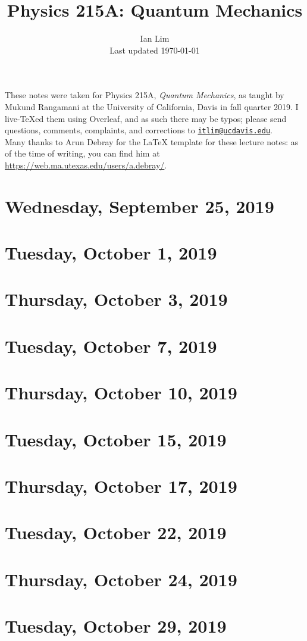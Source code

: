 \documentclass{../mynotes}
\begin{document}
\title{Physics 215A: Quantum Mechanics}
\author{Ian Lim\\ Last updated \today}
\maketitle
{\small\noindent These notes were taken for Physics 215A, \emph{Quantum Mechanics}, as taught by Mukund Rangamani at the University of California, Davis in fall quarter 2019. I live-\TeX ed them using Overleaf, and as such there may be typos; please send questions, comments, complaints, and corrections to 
\href{mailto:itlim@ucdavis.edu?subject=215A\%20Lecture\%20Notes}{\texttt{itlim@ucdavis.edu}}.\\
Many thanks to Arun Debray for the {\LaTeX} template for these lecture notes: as of the time of writing, you can find him at \url{https://web.ma.utexas.edu/users/a.debray/}.}

\tableofcontents

\section{Wednesday, September 25, 2019}
	

\section{Tuesday, October 1, 2019}
    

\section{Thursday, October 3, 2019}
    
\section{Tuesday, October 7, 2019}
    
    
\section{Thursday, October 10, 2019}
    
    
\section{Tuesday, October 15, 2019}
    
\section{Thursday, October 17, 2019}
    

\section{Tuesday, October 22, 2019}
    

\section{Thursday, October 24, 2019}
    

\section{Tuesday, October 29, 2019}
    
\end{document}
